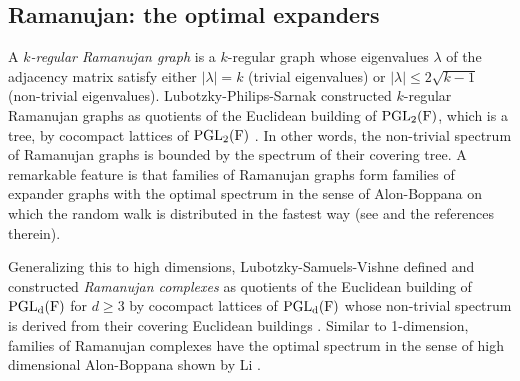 \documentclass[letterpaper, reqno, 11pt]{amsart}
\theoremstyle{definition}
\theoremstyle{definition}
\theoremstyle{remark}
\begin{document}



\subsection{Ramanujan: the optimal expanders}\label{intronra}
A \textit{$k$-regular Ramanujan graph} is a 
$k$-regular graph whose eigenvalues $\lambda$ of 
the adjacency matrix satisfy either 
$|\lambda|=k$ (trivial eigenvalues) or 
$|\lambda| \leq 2 \sqrt{k-1}$ (non-trivial eigenvalues). 
Lubotzky-Philips-Sarnak constructed $k$-regular Ramanujan graphs as quotients of the Euclidean building of $\rm{PGL}_2(F)$, which is a tree, by cocompact lattices of $\rm{PGL}_2(F)$ \cite{lubotzky1988ramanujan}.
In other words, the non-trivial spectrum of Ramanujan graphs is bounded by the spectrum of their covering tree. 
A remarkable feature is that families of Ramanujan graphs form families of expander graphs with the optimal spectrum in the sense of Alon-Boppana \cite{alon1986eigenvalues} on which the random walk is distributed in the fastest way (see \cite[Section 5]{lubotzky2020ramanujan} and the references therein). 



Generalizing this to high dimensions, Lubotzky-Samuels-Vishne defined and constructed \textit{Ramanujan complexes} as quotients of the Euclidean building of $\rm{PGL}_d(F)$ for $d \geq 3$ by cocompact lattices of $\rm{PGL}_d(F)$ whose non-trivial spectrum is derived from their covering Euclidean buildings \cite{lubotzky2005explicit}. 
Similar to 1-dimension, families of Ramanujan complexes have the optimal spectrum in the sense of high dimensional Alon-Boppana shown by Li \cite{li2004ramanujan}. 
\end{document}
